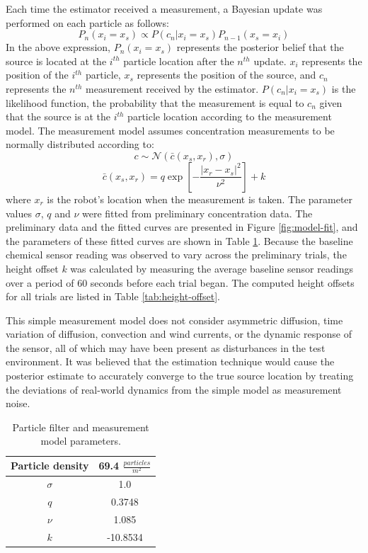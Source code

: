 \documentclass[submit, 12pt]{aiaa-pretty-modified}
\begin{document}
Each time the estimator received a measurement, a Bayesian update was performed
on each particle as follows:
\[P_n(x_i = x_s) \propto P(c_n | x_i = x_s) P_{n-1}(x_s = x_i)\] In the above
expression, $P_n(x_i = x_s)$ represents the posterior belief that the source is
located at the $i^{th}$ particle location after the $n^{th}$ update. $x_i$
represents the position of the $i^{th}$ particle, $x_s$ represents the position
of the source, and $c_n$ represents the $n^{th}$ measurement received by the
estimator. $P(c_n | x_i = x_s)$ is the likelihood function, the probability that
the measurement is equal to $c_n$ given that the source is at the $i^{th}$
particle location according to the measurement model. The measurement model
assumes concentration measurements to be normally distributed according to:
\[c \sim \mathcal{N}\left(\bar{c}(x_s,x_r), \sigma \right)\]
\[\bar{c}(x_s,x_r) = q \exp{\left[-\frac{|x_r - x_s|^2}{\nu^2}\right]} + k\]
where $x_r$ is the robot's location when the measurement is taken. The parameter
values $\sigma$, $q$ and $\nu$ were fitted from preliminary concentration data.
The preliminary data and the fitted curves are presented in Figure
\ref{fig:model-fit}, and the parameters of these fitted curves are shown in
Table \ref{tab:estimator-parameters}. Because the baseline chemical sensor
reading was observed to vary across the preliminary trials, the height offset
$k$ was calculated by measuring the average baseline sensor readings over a
period of 60
seconds before each trial began. The computed height offsets for all trials are
listed in Table \ref{tab:height-offset}.

This simple measurement model does not consider
asymmetric diffusion, time variation of diffusion, convection and wind currents,
or the dynamic response of the sensor, all of which may have been present as
disturbances in the test environment. It was believed that the estimation
technique would cause the posterior estimate to accurately converge to the true
source location by treating the deviations of real-world dynamics from the
simple model as measurement noise.

\begin{table}
\caption[Estimator parameters]{Particle filter and measurement model parameters.}
\begin{center}
\begin{tabular}{|c|c|}
\hline
Particle density & 69.4 $\frac{particles}{m^2}$ \\ \hline
$\sigma$ & 1.0 \\ \hline
$q$ & 0.3748 \\ \hline
$\nu$ & 1.085  \\ \hline
$k$ & -10.8534  \\ \hline
\end{tabular}
\end{center}
\label{tab:estimator-parameters}
\end{table}
\end{document}
